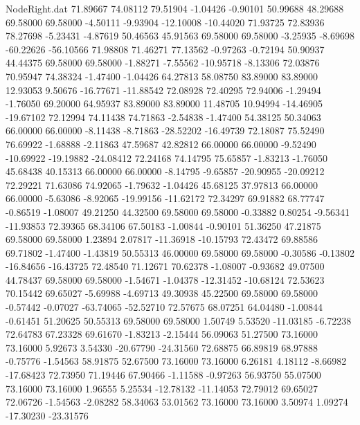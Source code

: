 \begin{filecontents}{NodeRight.dat}
  71.89667   74.08112   79.51904    -1.04426   -0.90101   50.99688   48.29688   69.58000   69.58000   -4.50111   -9.93904  -12.10008  -10.44020
  71.93725   72.83936   78.27698    -5.23431   -4.87619   50.46563   45.91563   69.58000   69.58000   -3.25935   -8.69698  -60.22626  -56.10566
  71.98808   71.46271   77.13562    -0.97263   -0.72194   50.90937   44.44375   69.58000   69.58000   -1.88271   -7.55562  -10.95718   -8.13306
  72.03876   70.95947   74.38324    -1.47400   -1.04426   64.27813   58.08750   83.89000   83.89000   12.93053    9.50676  -16.77671  -11.88542
  72.08928   72.40295   72.94006    -1.29494   -1.76050   69.20000   64.95937   83.89000   83.89000   11.48705   10.94994  -14.46905  -19.67102
  72.12994   74.11438   74.71863    -2.54838   -1.47400   54.38125   50.34063   66.00000   66.00000   -8.11438   -8.71863  -28.52202  -16.49739
  72.18087   75.52490   76.69922    -1.68888   -2.11863   47.59687   42.82812   66.00000   66.00000   -9.52490  -10.69922  -19.19882  -24.08412
  72.24168   74.14795   75.65857    -1.83213   -1.76050   45.68438   40.15313   66.00000   66.00000   -8.14795   -9.65857  -20.90955  -20.09212
  72.29221   71.63086   74.92065    -1.79632   -1.04426   45.68125   37.97813   66.00000   66.00000   -5.63086   -8.92065  -19.99156  -11.62172
  72.34297   69.91882   68.77747    -0.86519   -1.08007   49.21250   44.32500   69.58000   69.58000   -0.33882    0.80254   -9.56341  -11.93853
  72.39365   68.34106   67.50183    -1.00844   -0.90101   51.36250   47.21875   69.58000   69.58000    1.23894    2.07817  -11.36918  -10.15793
  72.43472   69.88586   69.71802    -1.47400   -1.43819   50.55313   46.00000   69.58000   69.58000   -0.30586   -0.13802  -16.84656  -16.43725
  72.48540   71.12671   70.62378    -1.08007   -0.93682   49.07500   44.78437   69.58000   69.58000   -1.54671   -1.04378  -12.31452  -10.68124
  72.53623   70.15442   69.65027    -5.69988   -4.69713   49.30938   45.22500   69.58000   69.58000   -0.57442   -0.07027  -63.74065  -52.52710
  72.57675   68.07251   64.04480    -1.00844   -0.61451   51.20625   50.55313   69.58000   69.58000    1.50749    5.53520  -11.03185   -6.72238
  72.64783   67.23328   69.61670    -1.83213   -2.15444   56.09063   51.27500   73.16000   73.16000    5.92673    3.54330  -20.67790  -24.31560
  72.68875   66.89819   68.97888    -0.75776   -1.54563   58.91875   52.67500   73.16000   73.16000    6.26181    4.18112   -8.66982  -17.68423
  72.73950   71.19446   67.90466    -1.11588   -0.97263   56.93750   55.07500   73.16000   73.16000    1.96555    5.25534  -12.78132  -11.14053
  72.79012   69.65027   72.06726    -1.54563   -2.08282   58.34063   53.01562   73.16000   73.16000    3.50974    1.09274  -17.30230  -23.31576

\end{filecontents}
